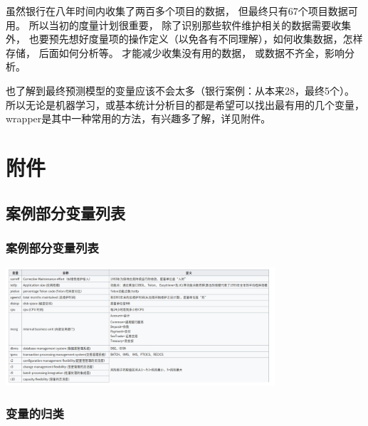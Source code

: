 虽然银行在八年时间内收集了两百多个项目的数据，
但最终只有67个项目数据可用。 所以当初的度量计划很重要，
除了识别那些软件维护相关的数据需要收集外，
也要预先想好度量项的操作定义（以免各有不同理解），如何收集数据，怎样存储，
后面如何分析等。 才能减少收集没有用的数据， 或数据不齐全，影响分析。

也了解到最终预测模型的变量应该不会太多（银行案例：从本来28，最终5个）。
所以无论是机器学习，或基本统计分析目的都是希望可以找出最有用的几个变量，wrapper是其中一种常用的方法，有兴趣多了解，详见附件。

\hypertarget{ux9644ux4ef6}{%
\section{附件}\label{ux9644ux4ef6}}

\hypertarget{ux6848ux4f8bux90e8ux5206ux53d8ux91cfux5217ux8868}{%
\subsection{案例部分变量列表}\label{ux6848ux4f8bux90e8ux5206ux53d8ux91cfux5217ux8868}}

\hypertarget{ux6848ux4f8bux90e8ux5206ux53d8ux91cfux8be6ux79f0ux4e0eux5b9aux4e49}{%
\subsubsection{案例部分变量列表}\label{ux6848ux4f8bux90e8ux5206ux53d8ux91cfux8be6ux79f0ux4e0eux5b9aux4e49}}


\includegraphics[width=10cm]{Screenshotfrom2023-01-0420-19-59.png}

\hypertarget{ux8fd9ux4e9bux53d8ux91cfux7684ux5f52ux7c7b}{%
\subsubsection{变量的归类}\label{ux8fd9ux4e9bux53d8ux91cfux7684ux5f52ux7c7b}}


